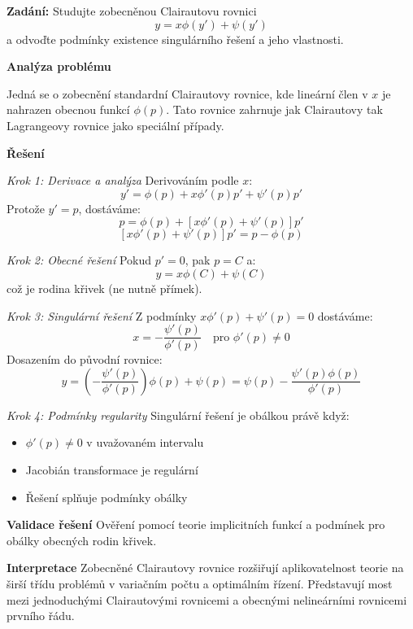\begin{example}
\label{ex:zobecnene-clairaut}

\noindent\textbf{Zadání:} Studujte zobecněnou Clairautovu rovnici
\[
y = x\phi(y') + \psi(y')
\]
a odvoďte podmínky existence singulárního řešení a jeho vlastnosti.

\vspace{1.5\baselineskip}

\noindent\textbf{Analýza problému}

Jedná se o zobecnění standardní Clairautovy rovnice, kde lineární člen v $x$ je nahrazen obecnou funkcí $\phi(p)$. Tato rovnice zahrnuje jak Clairautovy tak Lagrangeovy rovnice jako speciální případy.

\vspace{1.5\baselineskip}

\noindent\textbf{Řešení}

\noindent\textit{Krok 1: Derivace a analýza}
Derivováním podle $x$:
\[
y' = \phi(p) + x\phi'(p)p' + \psi'(p)p'
\]
Protože $y' = p$, dostáváme:
\[
p = \phi(p) + [x\phi'(p) + \psi'(p)]p'
\]
\[
[x\phi'(p) + \psi'(p)]p' = p - \phi(p)
\]

\vspace{1\baselineskip}

\noindent\textit{Krok 2: Obecné řešení}
Pokud $p' = 0$, pak $p = C$ a:
\[
y = x\phi(C) + \psi(C)
\]
což je rodina křivek (ne nutně přímek).

\vspace{1\baselineskip}

\noindent\textit{Krok 3: Singulární řešení}
Z podmínky $x\phi'(p) + \psi'(p) = 0$ dostáváme:
\[
x = -\frac{\psi'(p)}{\phi'(p)} \quad \text{pro } \phi'(p) \neq 0
\]
Dosazením do původní rovnice:
\[
y = \left(-\frac{\psi'(p)}{\phi'(p)}\right)\phi(p) + \psi(p) = \psi(p) - \frac{\psi'(p)\phi(p)}{\phi'(p)}
\]

\vspace{1\baselineskip}

\noindent\textit{Krok 4: Podmínky regularity}
Singulární řešení je obálkou právě když:
\begin{itemize}
\item $\phi'(p) \neq 0$ v uvažovaném intervalu
\item Jacobián transformace je regulární
\item Řešení splňuje podmínky obálky
\end{itemize}

\vspace{1.5\baselineskip}

\noindent\textbf{Validace řešení}
Ověření pomocí teorie implicitních funkcí a podmínek pro obálky obecných rodin křivek.

\vspace{1.5\baselineskip}

\noindent\textbf{Interpretace}
Zobecněné Clairautovy rovnice rozšiřují aplikovatelnost teorie na širší třídu problémů v variačním počtu a optimálním řízení. Představují most mezi jednoduchými Clairautovými rovnicemi a obecnými nelineárními rovnicemi prvního řádu.

\end{example}

